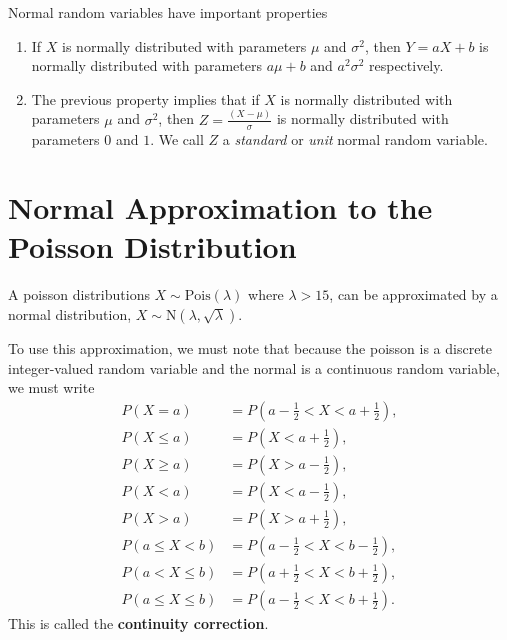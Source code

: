 \begin{note} \label{mod2:note:Normal:Properties}
	Normal random variables have important properties
	\begin{enumerate}[label = (\roman*)]
		\item If $X$ is normally distributed with parameters $\mu$ and $\sigma^2$, then $Y = aX + b$ is normally distributed with parameters $a\mu + b$ and $a^2\sigma^2$ respectively. \label{mod2:note:Normal:Property1}
		\item The previous property implies that if $X$ is normally distributed with parameters $\mu$ and $\sigma^2$, then $Z=\frac{(X-\mu)}{\sigma}$ is normally distributed with parameters $0$ and $1$. We call $Z$ a \textit{standard} or \textit{unit} normal random variable. \label{mod2:note:Normal:Property2}
	\end{enumerate}
\end{note}


\section{Normal Approximation to the Poisson Distribution} \label{mod2:section:NormalApproxPois}

\begin{defn}\label{mod2:def:NormalApproxToPois:Definition}
	A poisson distributions $X \sim \text{Pois}(\lambda)$ where $\lambda > 15$, can be approximated by a normal distribution, $X \sim \text{N}(\lambda, \sqrt{\lambda})$.
\end{defn}

\begin{note}\label{mod2:note:NormalApproxtoPois:Continuity}
	To use this approximation, we must note that because the poisson is a discrete integer-valued random variable and the normal is a continuous random variable, we must write
	\begin{align}
	P(X=a) &= P \left( a -\frac{1}{2} < X < a + \frac{1}{2} \right), \\
	P(X \leq a) &= P \left( X < a + \frac{1}{2} \right), \\
	P(X \geq a) &= P \left( X > a - \frac{1}{2} \right), \\
	P(X < a) &= P \left( X < a - \frac{1}{2} \right), \\
	P(X > a) &= P \left( X > a + \frac{1}{2} \right), \\
	P(a \leq X < b) &= P \left( a - \frac{1}{2} < X < b - \frac{1}{2} \right), \\
	P(a < X \leq  b) &= P \left( a + \frac{1}{2} < X < b + \frac{1}{2} \right), \\
	P(a  \leq  X \leq  b) &= P \left( a - \frac{1}{2} < X < b + \frac{1}{2} \right).
	\end{align}
	This is called the \textbf{continuity correction}.
\end{note}


